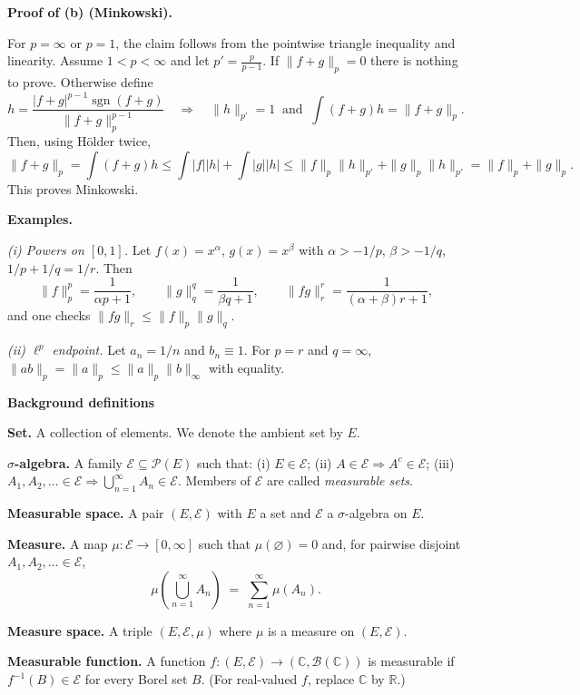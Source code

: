 \begin{problem}[CP-III-0003]
\bigskip
\textbf{Proof of (b) (Minkowski).}

For $p=\infty$ or $p=1$, the claim follows from the pointwise triangle inequality and linearity.
Assume $1<p<\infty$ and let $p'=\frac{p}{p-1}$. If $\|f+g\|_p=0$ there is nothing to prove.
Otherwise define
\[
h=\frac{|f+g|^{p-1}\operatorname{sgn}(f+g)}{\|f+g\|_p^{p-1}} \quad\Rightarrow\quad \|h\|_{p'}=1
\ \text{ and }\ \int (f+g)h=\|f+g\|_p.
\]
Then, using Hölder twice,
\[
\|f+g\|_p
= \int (f+g)h
\le \int |f||h|+\int |g||h|
\le \|f\|_p\|h\|_{p'}+\|g\|_p\|h\|_{p'}
= \|f\|_p+\|g\|_p.
\]
This proves Minkowski.

\bigskip
\textbf{Examples.}

\emph{(i) Powers on $[0,1]$.}
Let $f(x)=x^{\alpha}$, $g(x)=x^{\beta}$ with $\alpha>-1/p$, $\beta>-1/q$, $1/p+1/q=1/r$. Then
\[
\|f\|_{p}^{p}=\frac{1}{\alpha p+1},\qquad
\|g\|_{q}^{q}=\frac{1}{\beta q+1},\qquad
\|fg\|_{r}^{r}=\frac{1}{(\alpha+\beta)r+1},
\]
and one checks $\|fg\|_{r}\le \|f\|_{p}\|g\|_{q}$.

\emph{(ii) $\ell^p$ endpoint.}
Let $a_n=1/n$ and $b_n\equiv 1$. For $p=r$ and $q=\infty$,
$\|ab\|_{p}=\|a\|_{p}\le \|a\|_{p}\|b\|_{\infty}$ with equality.



\par\medskip\noindent\textbf{Background definitions}\quad


	\textbf{Set.}
	A collection of elements. We denote the ambient set by $E$.

	\textbf{$\sigma$-algebra.}
	A family $\mathcal E\subseteq \mathcal P(E)$ such that:
	(i) $E\in\mathcal E$; \;
	(ii) $A\in\mathcal E \Rightarrow A^{c}\in\mathcal E$; \;
	(iii) $A_1,A_2,\dots\in\mathcal E \Rightarrow \bigcup_{n=1}^\infty A_n\in\mathcal E$.
	Members of $\mathcal E$ are called \emph{measurable sets}.

	\textbf{Measurable space.}
	A pair $(E,\mathcal E)$ with $E$ a set and $\mathcal E$ a $\sigma$-algebra on $E$.

	\textbf{Measure.}
	A map $\mu:\mathcal E\to[0,\infty]$ such that $\mu(\varnothing)=0$ and, for pairwise disjoint
	$A_1,A_2,\dots\in\mathcal E$,
	\[
	\mu\!\left(\bigcup_{n=1}^\infty A_n\right) \;=\; \sum_{n=1}^\infty \mu(A_n).
	\]

	\textbf{Measure space.}
	A triple $(E,\mathcal E,\mu)$ where $\mu$ is a measure on $(E,\mathcal E)$.

	\textbf{Measurable function.}
	A function $f:(E,\mathcal E)\to(\mathbb C,\mathcal B(\mathbb C))$ is measurable if
	$f^{-1}(B)\in\mathcal E$ for every Borel set $B$.
	(For real-valued $f$, replace $\mathbb C$ by $\mathbb R$.)


\end{problem}

